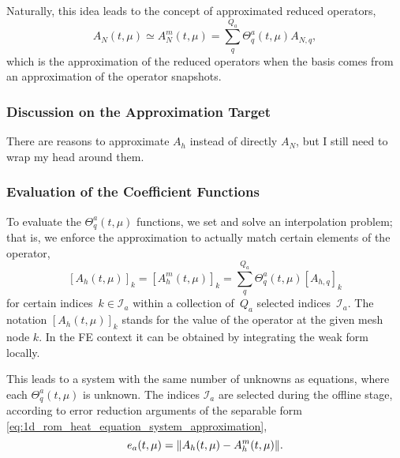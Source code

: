 \documentclass[../main.tex]{subfiles}
\begin{document}
Naturally, this idea leads to the concept of approximated reduced operators,
\begin{equation}
    A_N(t, \mu) \simeq A_N^m(t, \mu) = \sum_q^{Q_a} \Theta_q^a(t, \mu) A_{N,q},
\end{equation}
which is the approximation of the reduced operators when the basis comes from an approximation of the operator snapshots. 

\subsubsection{Discussion on the Approximation Target}
There are reasons to approximate $A_h$ instead of directly $A_N$, but I still need to wrap my head around them. 

\subsubsection{Evaluation of the Coefficient Functions}
To evaluate the $\Theta_q^a(t, \mu)$ functions, we set and solve an interpolation problem;
that is, 
we enforce the approximation to actually match certain elements of the operator, 
\begin{equation}
    \label{eq:1d_rom_heat_equation_interpolation_problem}
    [A_h(t, \mu)]_{k} = [A_h^m(t, \mu)]_{k} = \sum_q^{Q_a} \Theta_q^a(t, \mu) [A_{h, q}]_{k}
\end{equation}
for certain indices~$k \in \mathcal{I}_a$ within a collection of~$Q_a$ selected indices~$\mathcal{I}_a$.
The notation $[A_h(t, \mu)]_{k}$ stands for the value of the operator at the given mesh node $k$.
In the FE context it can be obtained by integrating the weak form locally.

This leads to a system with the same number of unknowns as equations, where each $\Theta_q^a(t, \mu)$ is unknown.
The indices $\mathcal{I}_a$ are selected during the offline stage, according to error reduction arguments of the separable form \eqref{eq:1d_rom_heat_equation_system_approximation},
\begin{equation}
    e_a(t, \mu) = \norm{A_h(t, \mu) - A_h^m(t, \mu)}.
\end{equation}
\end{document}
